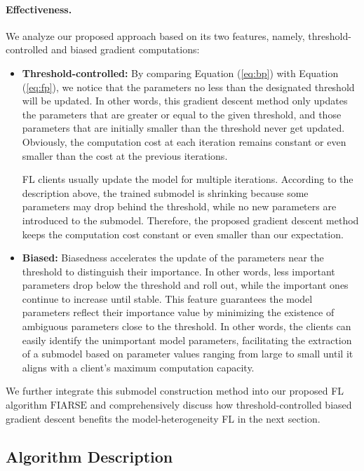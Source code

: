 \documentclass{article}
\theoremstyle{plain}
\theoremstyle{definition}
\theoremstyle{remark}
\newcommand{\algo}{\ensuremath{\text{FIARSE}}\xspace}
\renewcommand{\eqref}[1]{Equation (\ref{#1})}
\begin{document}
\paragraph{Effectiveness.} We analyze our proposed approach based on its two features, namely, threshold-controlled and biased gradient computations: 
\begin{itemize}[leftmargin=1em]
    \item \textbf{Threshold-controlled:} By comparing \eqref{eq:bp} with \eqref{eq:fp}, we notice that the parameters no less than the designated threshold will be updated. In other words, this gradient descent method only updates the parameters that are greater or equal to the given threshold, and those parameters that are initially smaller than the threshold never get updated. Obviously, the computation cost at each iteration remains constant or even smaller than the cost at the previous iterations. 

    FL clients usually update the model for multiple iterations. According to the description above, the trained submodel is shrinking because some parameters may drop behind the threshold, while no new parameters are introduced to the submodel. Therefore, the proposed gradient descent method keeps the computation cost constant or even smaller than our expectation. 
    \item \textbf{Biased:} Biasedness accelerates the update of the parameters near the threshold to distinguish their importance. In other words, less important parameters drop below the threshold and roll out, while the important ones continue to increase until stable. This feature guarantees the model parameters reflect their importance value by minimizing the existence of ambiguous parameters close to the threshold. In other words, the clients can easily identify the unimportant model parameters, facilitating the extraction of a submodel based on parameter values ranging from large to small until it aligns with a client's maximum computation capacity. 
\end{itemize}

We further integrate this submodel construction method into our proposed FL algorithm \algo and comprehensively discuss how threshold-controlled biased gradient descent benefits the model-heterogeneity FL in the next section. 

\subsection{Algorithm Description} \label{subsec:description}
\end{document}
